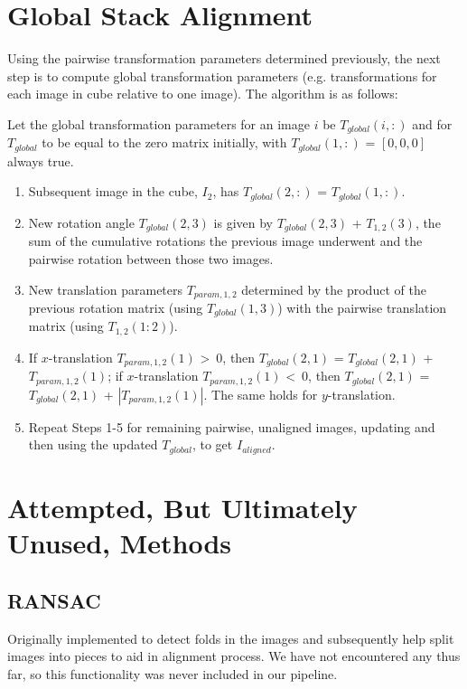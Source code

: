 \documentclass{article}
\begin{document}
\section{Global Stack Alignment}
Using the pairwise transformation parameters determined previously, the next step is to compute global transformation parameters (e.g. transformations for each image in cube relative to one image). The algorithm is as follows:
	\begin{algorithm}
	\DontPrintSemicolon
	Let the global transformation parameters for an image $i$ be $T_{global}(i,:)$ and for $T_{global}$ to be equal to the zero matrix initially, with $T_{global}(1,:)$ = $[0, 0, 0]$ always true. \\
	\begin{enumerate}
	\item Subsequent image in the cube, $I_{2}$, has $T_{global}(2,:)$ = $T_{global}(1,:)$. \\
	\item New rotation angle $T_{global}(2,3)$ is given by $T_{global}(2,3)$ + $T_{1,2}(3)$, the sum of the cumulative rotations the previous image underwent and the pairwise rotation between those two images. \\
	\item New translation parameters $T_{param,1,2}$ determined by the product of the previous rotation matrix (using $T_{global}(1,3)$) with the pairwise translation matrix (using $T_{1,2}(1:2)$). \\
	\item If $x$-translation $T_{param,1,2}(1)$ \textgreater\ $0$, then $T_{global}(2,1)$ = $T_{global}(2,1)$ + $T_{param,1,2}(1)$; if $x$-translation $T_{param,1,2}(1)$ \textless\ $0$, then $T_{global}(2,1)$ = $T_{global}(2,1)$ + $|T_{param,1,2}(1)|$. The same holds for $y$-translation. \\
	\item Repeat Steps 1-5 for remaining pairwise, unaligned images, updating and then using the updated $T_{global}$, to get $I_{aligned}$. 
	\end{enumerate}
	\end{algorithm}

\section{Attempted, But Ultimately Unused, Methods}
\subsection{RANSAC}
Originally implemented to detect folds in the images and subsequently help split images into pieces to aid in alignment process. We have not encountered any thus far, so this functionality was never included in our pipeline.
\end{document}
